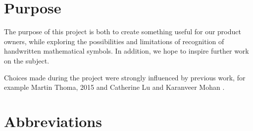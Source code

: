 \section{Purpose}
The purpose of this project is both to create something useful for our product owners, while exploring the possibilities and limitations of recognition of handwritten mathematical symbols. In addition, we hope to inspire further work on the subject. 

Choices made during the project were strongly influenced by previous work, for example Martin Thoma, 2015 \cite{thoma_-line_2015} and Catherine Lu and Karanveer Mohan \cite{lu_recognition_2015}.

\section{Abbreviations}  %

